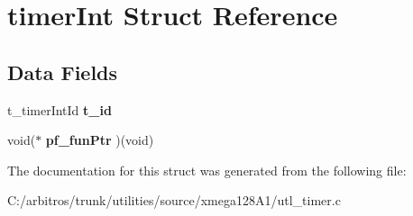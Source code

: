 \hypertarget{structtimer_int}{\section{timer\-Int Struct Reference}
\label{structtimer_int}
}
\subsection*{Data Fields}
\begin{DoxyCompactItemize}
\item 
\hypertarget{structtimer_int_a14c25b34a62ed016da4d7eaffb1628c3}{t\-\_\-timer\-Int\-Id {\bfseries t\-\_\-id}}\label{structtimer_int_a14c25b34a62ed016da4d7eaffb1628c3}

\item 
\hypertarget{structtimer_int_aeccc606c34776ed0934b58b6af7ebec7}{void($\ast$ {\bfseries pf\-\_\-fun\-Ptr} )(void)}\label{structtimer_int_aeccc606c34776ed0934b58b6af7ebec7}

\end{DoxyCompactItemize}


The documentation for this struct was generated from the following file\-:\begin{DoxyCompactItemize}
\item 
C\-:/arbitros/trunk/utilities/source/xmega128\-A1/utl\-\_\-timer.\-c\end{DoxyCompactItemize}

